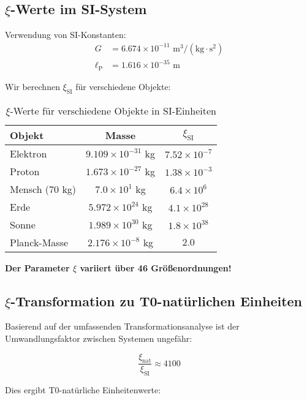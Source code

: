 \documentclass[12pt,a4paper]{article}
\newcommand{\xipar}{\xi}
\newcommand{\lP}{\ell_{\text{P}}}
\begin{document}
	\subsection{$\xipar$-Werte im SI-System}
	\label{subsec:xi_si_werte}
	
	Verwendung von SI-Konstanten:
	\begin{align}
		G &= 6.674 \times 10^{-11} \text{ m}^3/(\text{kg} \cdot \text{s}^2) \\
		\lP &= 1.616 \times 10^{-35} \text{ m}
	\end{align}
	
	Wir berechnen $\xipar_{\text{SI}}$ für verschiedene Objekte:
	
	\begin{table}[htbp]
		\centering
		\begin{tabular}{lcc}
			\toprule
			\textbf{Objekt} & \textbf{Masse} & \textbf{$\xipar_{\text{SI}}$} \\
			\midrule
			Elektron & $9.109 \times 10^{-31}$ kg & $7.52 \times 10^{-7}$ \\
			Proton & $1.673 \times 10^{-27}$ kg & $1.38 \times 10^{-3}$ \\
			Mensch (70 kg) & $7.0 \times 10^{1}$ kg & $6.4 \times 10^{6}$ \\
			Erde & $5.972 \times 10^{24}$ kg & $4.1 \times 10^{28}$ \\
			Sonne & $1.989 \times 10^{30}$ kg & $1.8 \times 10^{38}$ \\
			Planck-Masse & $2.176 \times 10^{-8}$ kg & $2.0$ \\
			\bottomrule
		\end{tabular}
		\caption{$\xipar$-Werte für verschiedene Objekte in SI-Einheiten}
		\label{tab:xi_si_werte}
	\end{table}
	
	\textbf{Der Parameter $\xipar$ variiert über 46 Größenordnungen!}
	
	\subsection{$\xipar$-Transformation zu T0-natürlichen Einheiten}
	\label{subsec:xi_transformation}
	
	Basierend auf der umfassenden Transformationsanalyse ist der Umwandlungsfaktor zwischen Systemen ungefähr:
	
	$$\frac{\xipar_{\text{nat}}}{\xipar_{\text{SI}}} \approx 4100$$
	
	Dies ergibt T0-natürliche Einheitenwerte:
	
\end{document}
